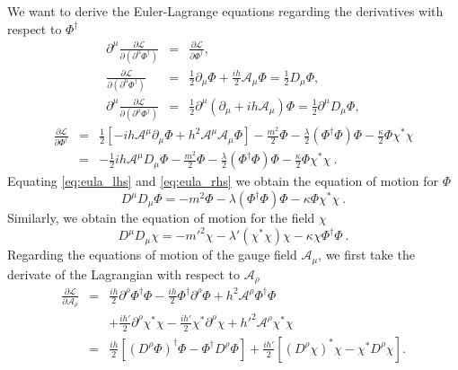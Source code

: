 We want to derive the Euler-Lagrange equations regarding the derivatives with respect to $\Phi^{\dagger}$
\begin{eqnarray}
	\partial^{\mu}\frac{\partial \mathcal{L}}{\partial (\partial^{\mu}\Phi^{\dagger})} & = & \frac{\partial \mathcal{L}}{\partial \Phi^{\dagger}},\nonumber \\
	\frac{\partial  \mathcal{L}}{\partial (\partial^{\mu} \Phi^{\dagger})}  & = & \frac{1}{2}\partial_{\mu} \Phi + \frac{ih}{2}\mathcal{A}_{\mu}\Phi = \frac{1}{2}D_{\mu}\Phi,\nonumber \\
	\label{eq:eula_lhs}
	 \partial^{\mu}\frac{\partial \mathcal{L}}{\partial (\partial^{\mu}\Phi^{\dagger})} & = & \frac{1}{2}\partial^{\mu} \left(\partial_{\mu} + i h\mathcal{A}_{\mu}\right)\Phi = \frac{1}{2}\partial^{\mu}D_{\mu}\Phi,
\end{eqnarray}
\begin{eqnarray}
\label{eq:eula_rhs}
	\frac{\partial \mathcal{L}}{\partial \Phi^{\dagger}}  & = &  \frac{1}{2} \left[-ih\mathcal{A}^{\mu}\partial_{\mu}\Phi + h^2\mathcal{A}^{\mu}\mathcal{A}_{\mu}\Phi \right]- \frac{m^2}{2}\Phi -  \frac{\lambda}{2} (\Phi^{\dagger}\Phi)\Phi - \frac{\kappa}{2}\Phi \chi^*\chi\nonumber\\
	& = &-\frac{1}{2}ih\mathcal{A}^{\mu}D_{\mu} \Phi - \frac{m^2}{2}\Phi - \frac{\lambda}{2}  (\Phi^{\dagger}\Phi)\Phi - \frac{\kappa}{2}\Phi \chi^*\chi \ .
\end{eqnarray}
Equating \eqref{eq:eula_lhs} and \eqref{eq:eula_rhs} we obtain the equation of motion for $\Phi$
\begin{equation}
	\label{eq:phi}
	D^{\mu}D_{\mu} \Phi = -m^2 \Phi - \lambda (\Phi^{\dagger}\Phi)\Phi - \kappa \Phi \chi^* \chi \ .
\end{equation}
Similarly, we obtain the equation of motion for the field $\chi$
\begin{equation}
	\label{eq:chi}
	D^{\mu}D_{\mu} \chi = -m'^2 \chi - \lambda' (\chi^{*}\chi)\chi - \kappa \chi \Phi^{\dagger} \Phi \ . 
\end{equation}
Regarding the equations of motion of the gauge field $\mathcal{A}_{\mu}$, we first take the derivate of the Lagrangian with respect to $\mathcal{A}_{\rho}$
\begin{eqnarray}
	\frac{\partial \mathcal{L}}{\partial \mathcal{A}_{\rho}} & = & \frac{ih}{2}\partial^{\rho}\Phi^{\dagger}\Phi -\frac{ih}{2}\Phi^{\dagger}\partial^{\rho}
	 \Phi+h^2\mathcal{A}^{\rho}\Phi^{\dagger}\Phi\nonumber\\
	 & & + \frac{ih'}{2}\partial^{\rho}\chi^{*}\chi -\frac{ih'}{2}\chi^{*}\partial^{\rho}\chi+h'^2\mathcal{A}^{\rho}\chi^{*}\chi \nonumber\\
	& = & \frac{ih}{2}\left[ (D^{\rho}\Phi)^{\dagger}\Phi-\Phi^{\dagger}D^{\rho}\Phi\right] + \frac{ih'}{2}\left[ (D^{\rho}\chi)^{*}\chi-\chi^{*}D^{\rho}\chi\right].
\end{eqnarray}
